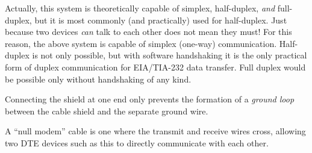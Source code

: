 












Actually, this system is theoretically capable of simplex, half-duplex, {\it and} full-duplex, but it is most commonly (and practically) used for half-duplex.  Just because two devices {\it can} talk to each other does not mean they must!  For this reason, the above system is capable of simplex (one-way) communication.  Half-duplex is not only possible, but with software handshaking it is the only practical form of duplex communication for EIA/TIA-232 data transfer.  Full duplex would be possible only without handshaking of any kind.

\vskip 10pt

Connecting the shield at one end only prevents the formation of a {\it ground loop} between the cable shield and the separate ground wire.

\vskip 10pt

A ``null modem'' cable is one where the transmit and receive wires cross, allowing two DTE devices such as this to directly communicate with each other.




